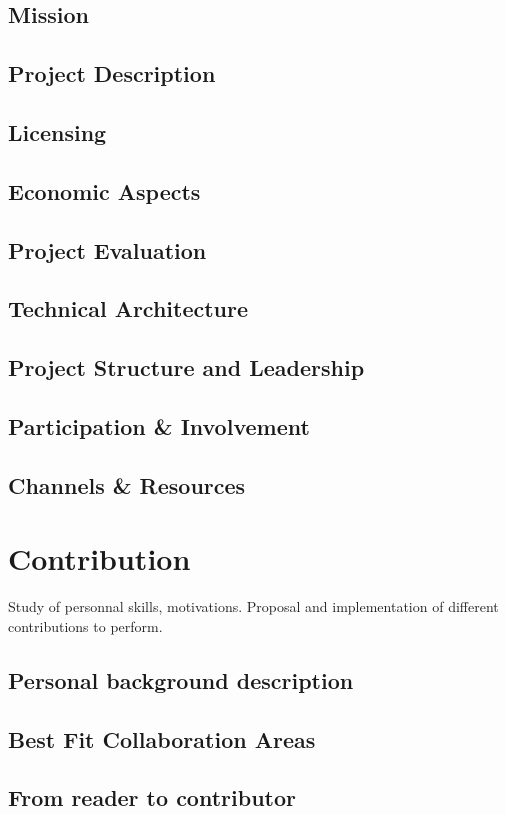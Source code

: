 \documentclass[11pt]{article}
\begin{document}
\subsection{Mission}
\subsection{Project Description}
\subsection{Licensing}
\subsection{Economic Aspects}
\subsection{Project Evaluation}
\subsection{Technical Architecture}
\subsection{Project Structure and Leadership}
\subsection{Participation \& Involvement}
\subsection{Channels \& Resources}

\section{Contribution}
Study of personnal skills, motivations. Proposal and implementation of different contributions to perform.
\subsection{Personal background description}
\subsection{Best Fit Collaboration Areas}
\subsection{From reader to contributor}
\end{document}
